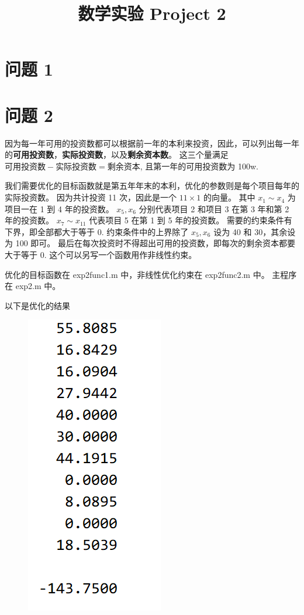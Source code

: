 \documentclass[11pt]{ctexart}
\title{数学实验 Project 2}
\begin{document}
	\maketitle
	\section{问题 1}
	

	\section{问题 2}
	因为每一年可用的投资数都可以根据前一年的本利来投资，因此，可以列出每一年的\textbf{可用投资数}，\textbf{实际投资数}，以及\textbf{剩余资本数}。
	这三个量满足 \(\textbf{可用投资数}-\textbf{实际投资数}=\textbf{剩余资本}\), 且第一年的可用投资数为 100w.

	我们需要优化的目标函数就是第五年年末的本利，优化的参数则是每个项目每年的实际投资数。
	因为共计投资 11 次，因此是一个 \(11\times 1\) 的向量。
	其中 \(x_1 \sim x_4\) 为项目一在 1 到 4 年的投资数。
	\(x_5,x_6\) 分别代表项目 2 和项目 3 在第 3 年和第 2 年的投资数。
	\(x_7\sim x_{11}\) 代表项目 5 在第 1 到 5 年的投资数。
	需要的约束条件有下界，即全部都大于等于 0.
	约束条件中的上界除了 \(x_5,x_6\) 设为 40 和 30，其余设为 100 即可。
	最后在每次投资时不得超出可用的投资数，即每次的剩余资本都要大于等于 0.
	这个可以另写一个函数用作非线性约束。

	优化的目标函数在 exp2func1.m 中，非线性优化约束在 exp2func2.m 中。
	主程序在 exp2.m 中。

	以下是优化的结果
	\begin{figure}[H]
		\centering
		\includegraphics[]{picture/exp2}
	\end{figure}
\end{document}
